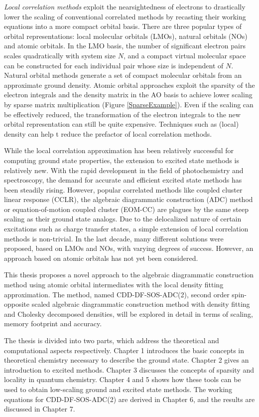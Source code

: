 \emph{Local correlation methods} exploit the nearsightedness of electrons to drastically lower the scaling of conventional correlated methods by recasting their working equations into a more compact orbital basis. There are three popular types of orbital representations: local molecular orbitals (LMOs), natural orbitals (NOs) and atomic orbitals. In the LMO basis, the number of significant electron pairs scales quadratically with system size $N$, and a compact virtual molecular space can be constructed for each individual pair whose size is independent of $N$. Natural orbital methods generate a set of compact molecular orbitals from an approximate ground density. Atomic orbital approaches exploit the sparsity of the electron integrals and the density matrix in the AO basis to achieve lower scaling by sparse matrix multiplication (Figure \ref{SparseExample}). Even if the scaling can be effectively reduced, the transformation of the electron integrals to the new orbital representation can still be quite expensive. Techniques such as (local) density can help t reduce the prefactor of local correlation methods.

While the local correlation approximation has been relatively successful for computing ground state properties, the extension to excited state methods is relatively new. With the rapid development in the field of photochemistry and spectroscopy, the demand for accurate and efficient excited state methods has been steadily rising. However, popular correlated methods like coupled cluster linear response (CCLR), the algebraic diagrammatic construction (ADC) method or equation-of-motion coupled cluster (EOM-CC) are plagues by the same steep scaling as their ground state analogs. Due to the delocalized nature of certain excitations such as charge transfer states, a simple extension of local correlation methods is non-trivial. In the last decade, many different solutions were proposed, based on LMOs and NOs, with varying degrees of success. However, an approach based on atomic orbitals has not yet been considered.

This thesis proposes a novel approach to the algebraic diagrammatic construction method using atomic orbital intermediates with the local density fitting approximation. The method, named CDD-DF-SOS-ADC(2), second order spin-opposite scaled  algebraic diagrammatic construction method with density fitting and Cholesky decomposed densities, will be explored in detail in terms of scaling, memory footprint and accuracy.

The thesis is divided into two parts, which address the theoretical and computational aspects respectively. Chapter 1 introduces the basic concepts in theoretical chemistry necessary to describe the ground state. Chapter 2 gives an introduction to excited methods. Chapter 3 discusses the concepts of sparsity and locality in quantum chemistry. Chapter 4 and 5 shows how these tools can be used to obtain low-scaling ground and excited state methods. The working equations for CDD-DF-SOS-ADC(2) are derived in Chapter 6, and the results are discussed in Chapter 7.

